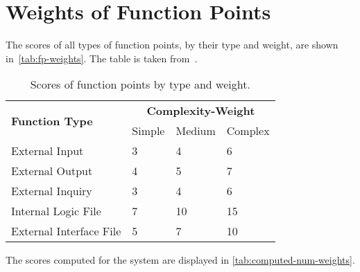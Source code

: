 \section{Weights of Function Points}
The scores of all types of function points, by their type and weight, are shown in~\autoref{tab:fp-weights}. The table is taken from~\cite{cocomo-manual}.
\begin{table}
    \centering
    \begin{tabular}{| l | l | l | l |}
        \hline
        \multirow{2}{*}{\textbf{Function Type}} & \multicolumn{3}{c|}{\textbf{Complexity-Weight}} \\
        \cline{2-4}
        & Simple & Medium & Complex \\
        \hline
        External Input          & 3     & 4     & 6     \\
        External Output         & 4     & 5     & 7     \\
        External Inquiry        & 3     & 4     & 6     \\
        Internal Logic File     & 7     & 10    & 15    \\
        External Interface File & 5     & 7     & 10    \\
        \hline
    \end{tabular}
    \caption{Scores of function points by type and weight.}
    \label{tab:fp-weights}
\end{table}


The scores computed for the system are displayed in \autoref{tab:computed-num-weights}.

